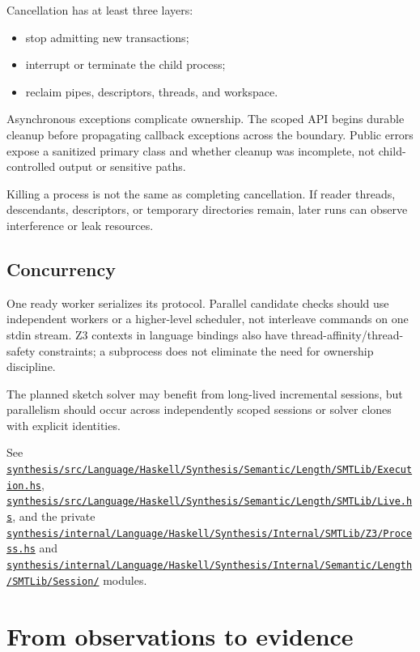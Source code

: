 \documentclass[10pt,letterpaper,oneside]{report}
\def\DjexPinnedCommit{7d65eba6f753727ae7b3d734fb4a7e00f1f44aa7}
\def\DjexBase{https://github.com/VladimirReshetnikov/Djex/blob/\DjexPinnedCommit/}
\newcommand{\dpath}[1]{\href{\DjexBase#1}{\nolinkurl{#1}}}
\begin{document}
Cancellation has at least three layers:

\begin{itemize}
\item stop admitting new transactions;
\item interrupt or terminate the child process;
\item reclaim pipes, descriptors, threads, and workspace.
\end{itemize}

Asynchronous exceptions complicate ownership. The scoped API begins durable cleanup before propagating callback exceptions across the boundary. Public errors expose a sanitized primary class and whether cleanup was incomplete, not child-controlled output or sensitive paths.

\begin{pitfall}
Killing a process is not the same as completing cancellation. If reader threads, descendants, descriptors, or temporary directories remain, later runs can observe interference or leak resources.
\end{pitfall}

\section{Concurrency}

One ready worker serializes its protocol. Parallel candidate checks should use independent workers or a higher-level scheduler, not interleave commands on one stdin stream. Z3 contexts in language bindings also have thread-affinity/thread-safety constraints; a subprocess does not eliminate the need for ownership discipline.

The planned sketch solver may benefit from long-lived incremental sessions, but parallelism should occur across independently scoped sessions or solver clones with explicit identities.

\begin{sourcebox}
See \dpath{synthesis/src/Language/Haskell/Synthesis/Semantic/Length/SMTLib/Execution.hs}, \dpath{synthesis/src/Language/Haskell/Synthesis/Semantic/Length/SMTLib/Live.hs}, and the private \dpath{synthesis/internal/Language/Haskell/Synthesis/Internal/SMTLib/Z3/Process.hs} and \dpath{synthesis/internal/Language/Haskell/Synthesis/Internal/Semantic/Length/SMTLib/Session/} modules.
\end{sourcebox}

\chapter{From observations to evidence}
\label{chap:evidence}
\end{document}

